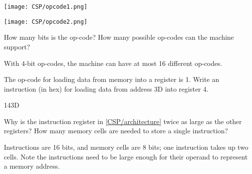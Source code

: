 

\begin{multicols}{2}
\texttt{[image: CSP/opcode1.png]}

\columnbreak

\texttt{[image: CSP/opcode2.png]}
\end{multicols}




\Q How many bits is the op-code? How many possible op-codes can the machine support?

\begin{answer}
With 4-bit op-codes, the machine can have at most 16 different op-codes.
\end{answer}


\Q The op-code for loading data from memory into a register is 1.
Write an instruction (in hex) for loading data from address 3D into register 4.

\begin{answer}
143D
\end{answer}


\Q Why is the instruction register in \ref{CSP/architecture} twice as large as the other registers?
How many memory cells are needed to store a single instruction?

\begin{answer}
Instructions are 16 bits, and memory cells are 8 bits; one instruction takes up two cells.
Note the instructions need to be large enough for their operand to represent a memory address.
\end{answer}
